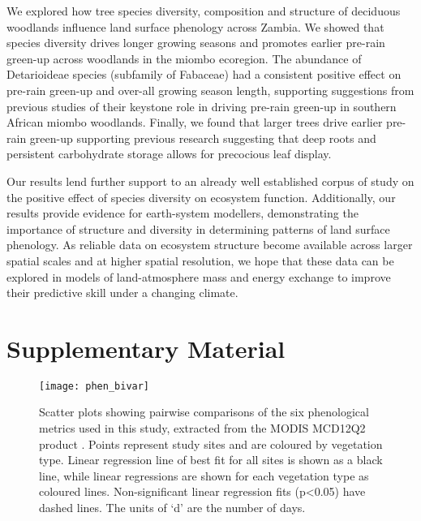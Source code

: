 \documentclass[11pt,a4paper]{article}
\newcommand{\beginsupplement}{%
	\setcounter{table}{0}
	\renewcommand{\thetable}{S\arabic{table}}%
	\setcounter{figure}{0}
	\renewcommand{\thefigure}{S\arabic{figure}}%
	}
\begin{document}
We explored how tree species diversity, composition and structure of deciduous
woodlands influence land surface phenology across Zambia. We showed that
species diversity drives longer growing seasons and promotes earlier pre-rain
green-up across woodlands in the miombo ecoregion. The abundance of
Detarioideae species (subfamily of Fabaceae) had a consistent positive effect
on pre-rain green-up and over-all growing season length, supporting suggestions
from previous studies of their keystone role in driving pre-rain green-up in
southern African miombo woodlands. Finally, we found that larger trees drive
earlier pre-rain green-up supporting previous research suggesting that deep
roots and persistent carbohydrate storage allows for precocious leaf display.

Our results lend further support to an already well established corpus of study
on the positive effect of species diversity on ecosystem function.
Additionally, our results provide evidence for earth-system modellers,
demonstrating the importance of structure and diversity in determining patterns
of land surface phenology. As reliable data on ecosystem structure become
available across larger spatial scales and at higher spatial resolution, we
hope that these data can be explored in models of land-atmosphere mass and
energy exchange to improve their predictive skill under a changing climate.

\printbibliography

\section{Supplementary Material}
\beginsupplement

\begin{figure}[H]
\centering
	\texttt{[image: phen\_bivar]}
	\caption{Scatter plots showing pairwise comparisons of the six phenological
		metrics used in this study, extracted from the MODIS MCD12Q2 product
		\citep{MCD12Q2}. Points represent study sites and are coloured by vegetation
		type. Linear regression line of best fit for all sites is shown as a black
		line, while linear regressions are shown for each vegetation type as coloured
		lines. Non-significant linear regression fits (p<0.05) have dashed lines. The
		units of `d' are the number of days.}
	\label{phen_bivar}
\end{figure}

\begin{landscape}

\end{landscape}
\end{document}
